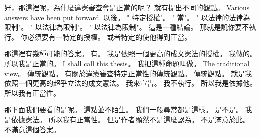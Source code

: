 \hypertarget{w02:cue:1701}{}好，那這裡呢，為什麼違憲審查會是正當的呢？
\hypertarget{w02:cue:1702}{}就有提出不同的觀點。
\hypertarget{w02:cue:1703}{}Various answers have been put forward.
\hypertarget{w02:cue:1704}{}以後。
\hypertarget{w02:cue:1705}{}" 特定授權"。
\hypertarget{w02:cue:1706}{}" 當"。
\hypertarget{w02:cue:1707}{}" 以法律的法律為限制"。
\hypertarget{w02:cue:1708}{}" 以法律為限制"。
\hypertarget{w02:cue:1709}{}" 以法律為限制"。
\hypertarget{w02:cue:1710}{}這是一種結論。
\hypertarget{w02:cue:1711}{}那就是說你要不執行。
\hypertarget{w02:cue:1712}{}你必須要有一特定的授權。
\hypertarget{w02:cue:1713}{}或者特定的使他得到正當。

\hypertarget{w02:cue:1714}{}那這裡有幾種可能的答案。
\hypertarget{w02:cue:1715}{}有。
\hypertarget{w02:cue:1716}{}我是依照一個更高的成文憲法的授權。
\hypertarget{w02:cue:1717}{}我做的。
\hypertarget{w02:cue:1718}{}所以我是正當的。
\hypertarget{w02:cue:1719}{}I shall call this thesis。
\hypertarget{w02:cue:1720}{}我把這種命題叫做。
\hypertarget{w02:cue:1721}{}The traditional view。
\hypertarget{w02:cue:1722}{}傳統觀點。
\hypertarget{w02:cue:1723}{}有關於違憲審查特定正當性的傳統觀點。
\hypertarget{w02:cue:1724}{}傳統觀點。
\hypertarget{w02:cue:1725}{}就是我依照一個更高的超乎立法的成文憲法。
\hypertarget{w02:cue:1726}{}我來宣告。
\hypertarget{w02:cue:1727}{}我不執行。
\hypertarget{w02:cue:1728}{}所以我是依據他。
\hypertarget{w02:cue:1729}{}所以我有正當性。

\hypertarget{w02:cue:1730}{}那下面我們要看的是呢。
\hypertarget{w02:cue:1731}{}這點並不陌生。
\hypertarget{w02:cue:1732}{}我們一般尋常都是這樣。
\hypertarget{w02:cue:1733}{}是不是。
\hypertarget{w02:cue:1734}{}我是依據憲法。
\hypertarget{w02:cue:1735}{}所以我有正當性。
\hypertarget{w02:cue:1736}{}但是作者顯然不是這麼認為。
\hypertarget{w02:cue:1737}{}不是滿意於此。
\hypertarget{w02:cue:1738}{}不滿意這個答案。

